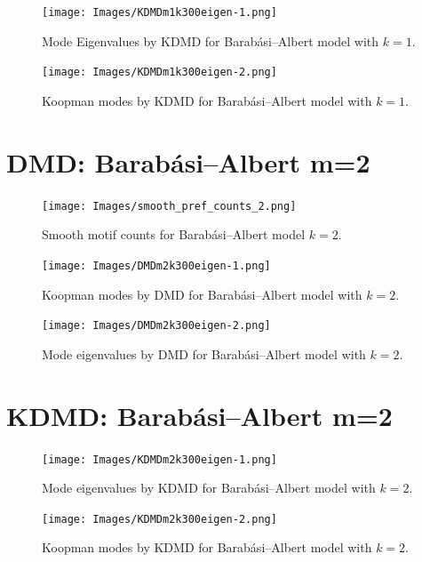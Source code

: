 \begin{figure}
    \texttt{[image: Images/KDMDm1k300eigen-1.png]}
    \centering
    \caption{Mode Eigenvalues by KDMD for Barabási–Albert model
    with $k=1$.}
\end{figure}

\begin{figure}
    \texttt{[image: Images/KDMDm1k300eigen-2.png]}
    \centering
    \caption{Koopman modes by KDMD for Barabási–Albert model
    with $k=1$.}
\end{figure}

\clearpage

\FloatBarrier

\section{DMD: Barabási–Albert m=2}

\begin{figure}
    \texttt{[image: Images/smooth\_pref\_counts\_2.png]}
    \centering
    \caption{Smooth motif counts for Barabási–Albert model $k=2$.}
\end{figure}

\clearpage
\begin{figure}
    \texttt{[image: Images/DMDm2k300eigen-1.png]}
    \centering
    \caption{Koopman modes by DMD for Barabási–Albert model
    with $k=2$.}
\end{figure}

\begin{figure}
    \texttt{[image: Images/DMDm2k300eigen-2.png]}
    \centering
    \caption{Mode eigenvalues by DMD for Barabási–Albert model
    with $k=2$.}
\end{figure}

\clearpage

\section{KDMD: Barabási–Albert m=2}

\begin{figure}
    \texttt{[image: Images/KDMDm2k300eigen-1.png]}
    \centering
    \caption{Mode eigenvalues by KDMD for Barabási–Albert model
    with $k=2$.}
\end{figure}

\begin{figure}
    \texttt{[image: Images/KDMDm2k300eigen-2.png]}
    \centering
    \caption{Koopman modes by KDMD for Barabási–Albert model
    with $k=2$.}
\end{figure}

